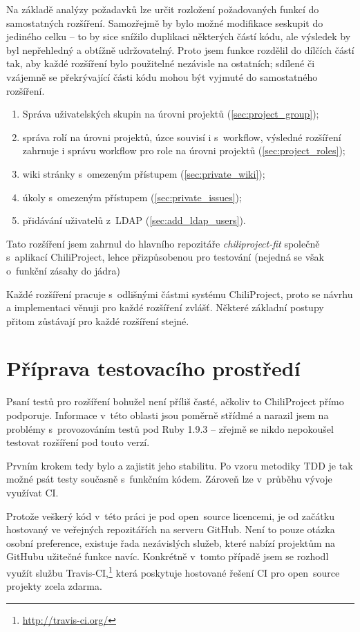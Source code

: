 \documentclass[thesis=B,czech]{FITthesis}[2012/05/02]
\begin{document}
Na základě analýzy požadavků lze určit rozložení požadovaných
funkcí do samostatných rozšíření. Samozřejmě by bylo možné modifikace
seskupit do jediného celku -- to by sice snížilo duplikaci některých částí kódu,
ale výsledek by byl nepřehledný a obtížně udržovatelný. Proto jsem funkce
rozdělil do dílčích částí tak, aby každé rozšíření bylo použitelné
nezávisle na ostatních; sdílené či vzájemně se překrývající části kódu
mohou být vyjmuté do samostatného rozšíření.

\begin{enumerate}
\item Správa uživatelských skupin na úrovni projektů (\ref{sec:project_group});
\item správa rolí na úrovni projektů, úzce souvisí i s~\gls{workflow}, výsledné rozšíření zahrnuje i
správu workflow pro role na úrovni projektů (\ref{sec:project_roles});
\item wiki stránky s~omezeným přístupem (\ref{sec:private_wiki});
\item úkoly s~omezeným přístupem (\ref{sec:private_issues});
\item přidávání uživatelů z~\gls{LDAP} (\ref{sec:add_ldap_users}).
\end{enumerate}

Tato rozšíření jsem zahrnul do hlavního repozitáře
\emph{chiliproject-fit} společně s~aplikací ChiliProject, lehce
přizpůsobenou pro testování (nejedná se však o~funkční zásahy do jádra)

Každé rozšíření pracuje s~odlišnými částmi systému ChiliProject, proto
se návrhu a implementaci věnuji pro každé rozšíření zvlášť. Některé
základní postupy přitom zůstávají pro každé rozšíření stejné.

\section{Příprava testovacího prostředí}

Psaní testů pro rozšíření bohužel není příliš časté, ačkoliv to
ChiliProject přímo podporuje. Informace v~této oblasti jsou poměrně
střídmé a narazil jsem na problémy s~provozováním testů pod Ruby 1.9.3
-- zřejmě se nikdo nepokoušel testovat rozšíření pod touto verzí.

Prvním krokem tedy bylo  a zajistit
jeho stabilitu. Po vzoru metodiky \gls{TDD} je tak možné psát testy
současně s~funkčním kódem. Zároveň lze v~průběhu vývoje využívat \gls{CI}.

Protože veškerý kód v~této práci je pod open~source licencemi,
je od začátku hostovaný ve veřejných repozitářích na serveru GitHub.
Není to pouze otázka osobní preference, existuje řada nezávislých služeb,
které nabízí projektům na GitHubu užitečné funkce navíc. Konkrétně
v~tomto případě jsem se rozhodl využít službu Travis-CI,\footnote{\url{http://travis-ci.org/}}
která poskytuje hostované řešení \gls{CI} pro open~source projekty zcela zdarma.
\end{document}
